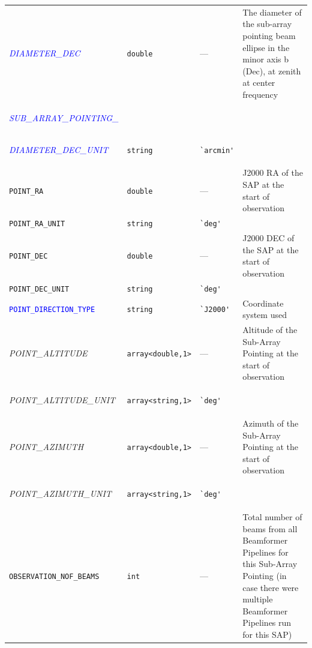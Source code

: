\documentclass[a4paper,10pt,bibtotoc]{scrartcl}
\begin{document}
\begin{small}
\begin{table}[h]
\begin{small}
\begin{tabular}{|lllp{5.5cm}|}
    \begin{scriptsize}\textcolor{blue}{\textit{ DIAMETER\_DEC}}\end{scriptsize} & \verb|double| & --- & The diameter of the sub-array pointing beam ellipse in the minor axis b (Dec), at zenith at center frequency \\
    \begin{scriptsize}\textcolor{blue}{\textit{SUB\_ARRAY\_POINTING\_}}\end{scriptsize}  &  &  & \\
    \begin{scriptsize}\textcolor{blue}{\textit{ DIAMETER\_DEC\_UNIT}}\end{scriptsize}  & \verb|string| & \verb|`arcmin'| & \\
    \verb|POINT_RA|  & \verb|double| & --- & J2000 RA of the SAP at the start of observation \\
    \verb|POINT_RA_UNIT|  & \verb|string| & \verb|`deg'| & \\
    \verb|POINT_DEC|  & \verb|double| & --- & J2000 DEC of the SAP at the start of observation \\
    \verb|POINT_DEC_UNIT|  & \verb|string| & \verb|`deg'| & \\
    \textcolor{blue}{\texttt{POINT\_DIRECTION\_TYPE}} & \verb|string| & \verb|`J2000'| & Coordinate system used \\
    \begin{scriptsize}\textit{POINT\_ALTITUDE}\end{scriptsize} & \verb|array<double,1>| & --- & Altitude of the Sub-Array Pointing at the start of observation \\
    \begin{scriptsize}\textit{POINT\_ALTITUDE\_UNIT}\end{scriptsize} & \verb|array<string,1>| & \verb|`deg'| & \\
    \begin{scriptsize}\textit{POINT\_AZIMUTH}\end{scriptsize} & \verb|array<double,1>| & --- & Azimuth of the Sub-Array Pointing at the start of observation \\
    \begin{scriptsize}\textit{POINT\_AZIMUTH\_UNIT}\end{scriptsize} & \verb|array<string,1>| & \verb|`deg'| & \\
    \verb|OBSERVATION_NOF_BEAMS|  & \verb|int| & --- & Total number of beams from all Beamformer Pipelines for this Sub-Array Pointing (in case there were multiple Beamformer Pipelines run for this SAP)  \\

\end{tabular}
\end{small}
\end{table}
\end{small}
\end{document}
